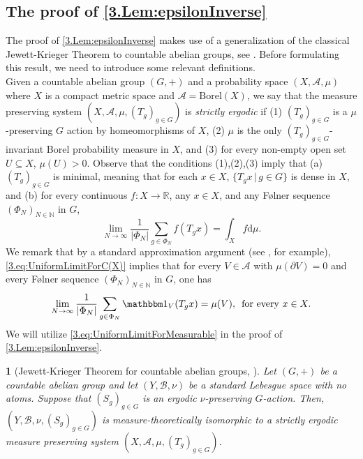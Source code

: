 \documentclass[11pt,american,preprint]{elsarticle}
\numberwithin{equation}{section}
\theoremstyle{plain}
\newtheorem{thm}{\protect\theoremname}[section]
\theoremstyle{plain*}
\theoremstyle{plain}
\theoremstyle{plain*}
\theoremstyle{plain}
\theoremstyle{plain*}
\theoremstyle{remark}
\theoremstyle{remark*}
\theoremstyle{remark}
\theoremstyle{remark*}
\theoremstyle{remark}
\theoremstyle{remark*}
\theoremstyle{plain}
\theoremstyle{definition}
\theoremstyle{plain}
\theoremstyle{plain} %
\providecommand{\theoremname}{Theorem}
\newcommand{\R}{\mathbb{R}}
\newcommand{\N}{\mathbb{N}}
\begin{document}
\subsection{The proof of \cref{3.Lem:epsilonInverse}}\label{Sec:9.2}
The proof of \cref{3.Lem:epsilonInverse} makes use of a generalization of the classical Jewett-Krieger Theorem to countable abelian groups, see \cite{Weis1985StricltyErgodic}. Before formulating this result, we need to introduce some relevant definitions.\\
Given a countable abelian group $(G,+)$  and a probability space $(X,\mathcal A,\mu)$ where $X$ is a compact metric space and $\mathcal A=\text{Borel}(X)$, we say that the measure preserving system $(X,\mathcal A,\mu,(T_g)_{g\in G})$ is \textit{strictly ergodic} if (1) $(T_g)_{g\in G}$ is a $\mu$-preserving $G$ action by homeomorphisms of $X$, (2) $\mu$ is the only $(T_g)_{g\in G}$-invariant Borel probability measure in $X$, and (3) for every non-empty open set $U\subseteq X$, $\mu(U)>0$. Observe that the conditions (1),(2),(3) imply that (a) $(T_g)_{g\in G}$ is minimal, meaning that for each $x\in X$, $\{T_gx\,|\,g\in G\}$ is dense in $X$, and (b) for every continuous $f:X\rightarrow \R$, any $x\in X$, and any F{\o}lner sequence $(\Phi_N)_{N\in\N}$ in $G$,
\begin{equation}\label{3.eq:UniformLimitForC(X)}
\lim_{N\rightarrow\infty}\frac{1}{|\Phi_N|}\sum_{g\in \Phi_N}f(T_gx)=\int_X f\text{d}\mu.
\end{equation}
We remark that by a standard approximation argument (see \cite[page 149]{waltersIntroduction}, for example), \eqref{3.eq:UniformLimitForC(X)} implies that for every $V\in\mathcal A$ with $\mu(\partial V)=0$ and   every F{\o}lner sequence $(\Phi_N)_{N\in\N}$ in $G$, one has 
\begin{equation}\label{3.eq:UniformLimitForMeasurable}
\lim_{N\rightarrow\infty}\frac{1}{|\Phi_N|}\sum_{g\in \Phi_N}\mathbbm 1_V(T_gx)=\mu(V),\,\text{ for every }x\in X.
\end{equation}
We will utilize \eqref{3.eq:UniformLimitForMeasurable} in the proof of \cref{3.Lem:epsilonInverse}.
\begin{thm}[Jewett-Krieger Theorem for countable abelian groups, \cite{Weis1985StricltyErgodic}]\label{3.Thm:AbelianJewettKrieger}
    Let $(G,+)$ be a countable abelian group and let $(Y,\mathcal B,\nu)$  be a standard Lebesgue space with no atoms. Suppose that $(S_g)_{g\in G}$ is an ergodic $\nu$-preserving $G$-action. Then, $(Y,\mathcal B,\nu, (S_g)_{g\in G})$ is measure-theoretically isomorphic to a strictly ergodic measure preserving system $(X,\mathcal A,\mu,(T_g)_{g\in G})$.
\end{thm}
\end{document}
